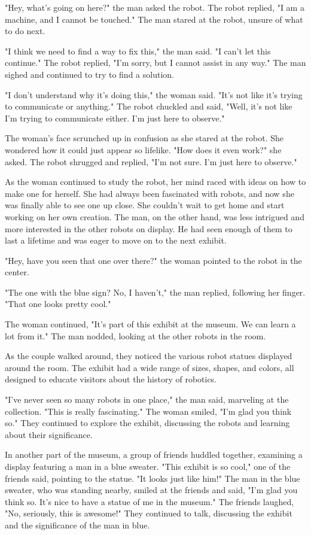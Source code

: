 \documentclass[smalldemyvopaper,11pt,twoside,onecolumn,openright,extrafontsizes]{memoir}
\begin{document}
"Hey, what's going on here?" the man asked the robot. The robot replied, "I am a machine, and I cannot be touched." The man stared at the robot, unsure of what to do next.\par
"I think we need to find a way to fix this," the man said. "I can't let this continue." The robot replied, "I'm sorry, but I cannot assist in any way." The man sighed and continued to try to find a solution.\par
"I don't understand why it's doing this," the woman said. "It's not like it's trying to communicate or anything." The robot chuckled and said, "Well, it's not like I'm trying to communicate either. I'm just here to observe."\par
The woman's face scrunched up in confusion as she stared at the robot. She wondered how it could just appear so lifelike. "How does it even work?" she asked. The robot shrugged and replied, "I'm not sure. I'm just here to observe."\par
As the woman continued to study the robot, her mind raced with ideas on how to make one for herself. She had always been fascinated with robots, and now she was finally able to see one up close. She couldn't wait to get home and start working on her own creation. The man, on the other hand, was less intrigued and more interested in the other robots on display. He had seen enough of them to last a lifetime and was eager to move on to the next exhibit.\par
"Hey, have you seen that one over there?" the woman pointed to the robot in the center.\par
"The one with the blue sign? No, I haven't," the man replied, following her finger. "That one looks pretty cool."\par
The woman continued, "It's part of this exhibit at the museum. We can learn a lot from it." The man nodded, looking at the other robots in the room.\par
As the couple walked around, they noticed the various robot statues displayed around the room. The exhibit had a wide range of sizes, shapes, and colors, all designed to educate visitors about the history of robotics.\par
"I've never seen so many robots in one place," the man said, marveling at the collection. "This is really fascinating." The woman smiled, "I'm glad you think so." They continued to explore the exhibit, discussing the robots and learning about their significance.\par
In another part of the museum, a group of friends huddled together, examining a display featuring a man in a blue sweater. "This exhibit is so cool," one of the friends said, pointing to the statue. "It looks just like him!" The man in the blue sweater, who was standing nearby, smiled at the friends and said, "I'm glad you think so. It's nice to have a statue of me in the museum." The friends laughed, "No, seriously, this is awesome!" They continued to talk, discussing the exhibit and the significance of the man in blue.\par
\end{document}
